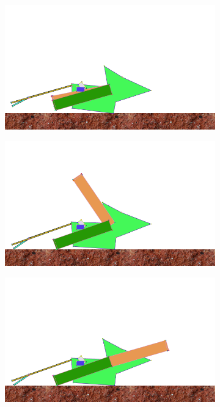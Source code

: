 \begin{figure}[H]
        \begin{subfigure}[b]{0.3\textwidth}
          \includegraphics[width=\linewidth,center]{graphics/simulation-discussion/ruder_1}
          \caption{\label{fig:ruder_1}}
        \end{subfigure}
        \hspace{\fill}
        \begin{subfigure}[b]{0.3\textwidth}
          \includegraphics[width=\linewidth,center]{graphics/simulation-discussion/ruder_2}
          \caption{\label{fig:ruder_2}}
        \end{subfigure}
        \hspace{\fill}
        \begin{subfigure}[b]{0.3\textwidth}
          \includegraphics[width=\linewidth,center]{graphics/simulation-discussion/ruder_3}
          \caption{\label{fig:ruder_3}}
        \end{subfigure}


\end{figure}
